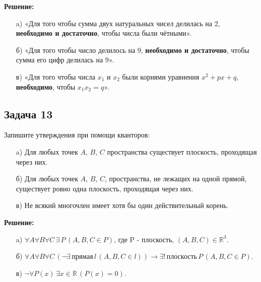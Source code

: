 \documentclass[a4paper,12pt]{article}
\begin{document}
\textbf{Решение:}
\begin{itemize}
    \item[a)] «Для того чтобы сумма двух натуральных чисел делилась на 2, \textbf{необходимо и достаточно}, чтобы числа были чётными».
    \vspace{1cm}
    
    \item[б)] «Для того чтобы число делилось на 9, \textbf{необходимо и достаточно}, чтобы сумма его цифр делилась на 9».
    \vspace{1cm}
    
    \item[в)] «Для того чтобы числа \(x_1\) и \(x_2\) были корнями уравнения \(x^2 + px + q\), \textbf{необходимо}, чтобы \(x_1 x_2 = q\)».
\end{itemize}
\vspace{1cm}

\subsection{Задача 13}
Запишите утверждения при помощи кванторов:
\begin{itemize}
    \item[a)] Для любых точек \(A\), \(B\), \(C\) пространства существует плоскость, проходящая через них.
    \item[б)] Для любых точек \(A\), \(B\), \(C\), пространства, не лежащих на одной прямой, существует ровно одна плоскость, проходящая через них.
    \item[в)] Не всякий многочлен имеет хотя бы один действительный корень.
\end{itemize}

\textbf{Решение:}
\begin{itemize}
    \item[a)] \(\forall A \forall B \forall C \, \exists \, P \, (A, B, C \in P)\text{, где P - плоскость, }(A,B,C)\in \mathbb{R}^3 \).
    \vspace{1cm}
    
    \item[б)] \(\forall A \forall B \forall C \, (\neg \exists \, \text{прямая} \, l \, (A, B, C \in l)) \rightarrow \exists! \, \text{плоскость} \, P \, (A, B, C \in P)\).
    \vspace{1cm}
    
    \item[в)] \(\neg \forall P(x) \, \exists x \in \mathbb{R} \, (P(x) = 0)\).
\end{itemize}
\vspace{1cm}
\end{document}
